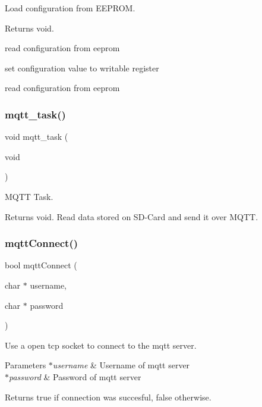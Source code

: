 Load configuration from E\+E\+P\+R\+OM. 

\begin{DoxyReturn}{Returns}
void. 
\end{DoxyReturn}
read configuration from eeprom

set configuration value to writable register

read configuration from eeprom \mbox{\label{rmap_8ino_a161bca6629368a46242fec07a965966a}} 
\subsubsection{\texorpdfstring{mqtt\+\_\+task()}{mqtt\_task()}}
{\footnotesize\ttfamily void mqtt\+\_\+task (\begin{DoxyParamCaption}\item[{void}]{ }\end{DoxyParamCaption})}



M\+Q\+TT Task. 

\begin{DoxyReturn}{Returns}
void. Read data stored on S\+D-\/\+Card and send it over M\+Q\+TT. 
\end{DoxyReturn}
\mbox{\label{rmap_8ino_a9f5e5ca8c47d4536dd1805e89fbb7db2}} 
\subsubsection{\texorpdfstring{mqtt\+Connect()}{mqttConnect()}}
{\footnotesize\ttfamily bool mqtt\+Connect (\begin{DoxyParamCaption}\item[{char $\ast$}]{username,  }\item[{char $\ast$}]{password }\end{DoxyParamCaption})}



Use a open tcp socket to connect to the mqtt server. 


\begin{DoxyParams}{Parameters}
{\em $\ast$username} & Username of mqtt server \\
\hline
{\em $\ast$password} & Password of mqtt server \\
\hline
\end{DoxyParams}
\begin{DoxyReturn}{Returns}
true if connection was succesful, false otherwise. 
\end{DoxyReturn}
\mbox{\label{rmap_8ino_aa0d50218413a12917f8c70ef4e1e1e72}} 
